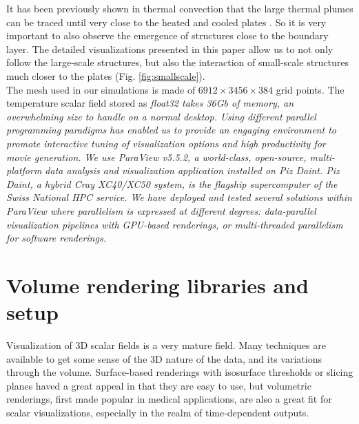 \documentclass[final,5p,times,twocolumn]{elsarticle}
\begin{document}
It has been previously shown in thermal convection that the large thermal plumes can be traced until very close to the heated and cooled plates \cite{ste18}. So it is very important to also observe the emergence of structures close to the boundary layer. The detailed visualizations presented in this paper allow us to not only follow the large-scale structures, but also the interaction of small-scale structures much closer to the plates (Fig. \ref{fig:smallscale}).\\

The mesh used in our simulations is made of $ 6912 \times 3456 \times 384 $ grid points.
The temperature scalar field stored as \it{float32} \rm takes 36Gb of memory, an
overwhelming size to handle on a normal desktop. Using different parallel programming
paradigms has enabled us to provide an engaging environment
to promote interactive tuning of visualization options and high productivity for movie
generation. We use ParaView v5.5.2, a world-class, open-source, multi-platform data analysis and
visualization application installed on Piz Daint. Piz Daint, a hybrid Cray XC40/XC50 system,
is the flagship supercomputer of the Swiss National HPC service. We have deployed
and tested several solutions within ParaView where parallelism is expressed
at different degrees: data-parallel visualization pipelines with GPU-based renderings,
or multi-threaded parallelism for software renderings.

\section{Volume rendering libraries and setup}

Visualization of 3D scalar fields is a very mature field. Many techniques are
available to get some sense of the 3D nature of the data, and its variations
through the volume. Surface-based renderings with isosurface thresholds or
slicing planes haved a great appeal in that they are easy to use, but volumetric
renderings, first made popular in medical applications, are also a great fit for
scalar visualizations, especially in the realm of time-dependent outputs.
\end{document}
